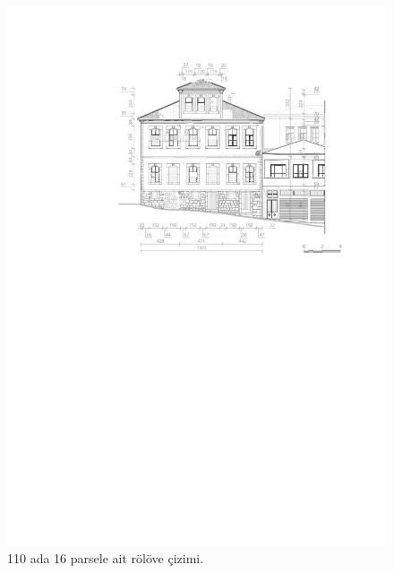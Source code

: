 \begin{figure}
\centering
\includegraphics[width=1\textwidth,height=\textheight]{source/figures/Roloveler/R110-16.pdf}
\caption{110 ada 16 parsele ait rölöve çizimi.}
\end{figure}

